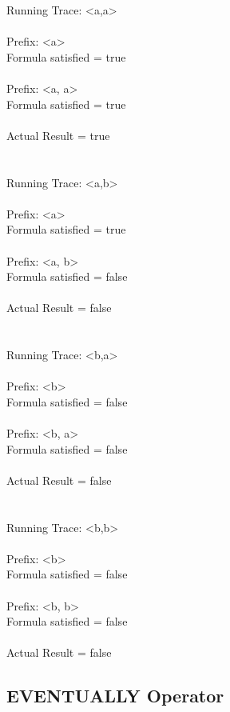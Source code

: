 \noindent Running Trace: \textless a,a\textgreater\\
\\
  Prefix: \textless a\textgreater\\
  Formula satisfied = true\\
\\
  Prefix: \textless a, a\textgreater\\
  Formula satisfied = true\\
\\
  Actual Result = true\\
\\
\\
Running Trace: \textless a,b\textgreater\\
\\
  Prefix: \textless a\textgreater\\
  Formula satisfied = true\\
\\
  Prefix: \textless a, b\textgreater\\
  Formula satisfied = false\\
\\
  Actual Result = false\\
\\
\\
Running Trace: \textless b,a\textgreater\\
\\
  Prefix: \textless b\textgreater\\
  Formula satisfied = false\\
\\
  Prefix: \textless b, a\textgreater\\
  Formula satisfied = false\\
\\
  Actual Result = false\\
\\
\\
Running Trace: \textless b,b\textgreater\\
\\
  Prefix: \textless b\textgreater\\
  Formula satisfied = false\\
\\
  Prefix: \textless b, b\textgreater\\
  Formula satisfied = false\\
\\
  Actual Result = false\\

\subsection{EVENTUALLY Operator}

